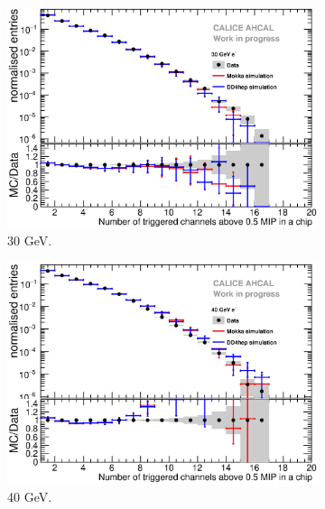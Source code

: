 \begin{figure}[htbp!]
\begin{subfigure}[t]{0.49\textwidth}
    \centering
    \includegraphics[width=1\textwidth]{../Thesis_Plots/Timing/Electrons/Plots/Comparison_SimData_Electrons_nHits_30GeV.eps}
    \caption{30 GeV.}\label{fig:elec_sim_data_nHits_30GeV}
  \end{subfigure}
  \hfill
  \begin{subfigure}[t]{0.49\textwidth}
    \centering
    \includegraphics[width=1\textwidth]{../Thesis_Plots/Timing/Electrons/Plots/Comparison_SimData_Electrons_nHits_40GeV.eps}
    \caption{40 GeV.}\label{fig:elec_sim_data_nHits_40GeV}
  \end{subfigure}
  \hfill
  \begin{subfigure}[t]{0.49\textwidth}
    \centering

\end{subfigure}
\end{figure}
